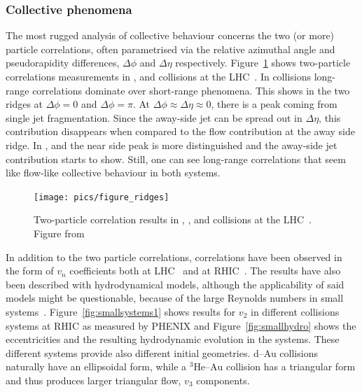 
\subsubsection{Collective phenomena}
The most rugged analysis of collective behaviour concerns the two (or more) particle correlations, often parametrised via the relative azimuthal angle and pseudorapidity differences, $\Delta \phi$ and $\Delta \eta$ respectively. Figure~\ref{fig:smallsystems2} shows two-particle correlations measurements in \PbPb, \pPb and \pp collisions at the LHC~\cite{Aad:2015gqa}. In \PbPb collisions long-range correlations dominate over short-range phenomena. This shows in the two ridges at $\Delta \phi = 0 $ and $\Delta \phi = \pi$. At $\Delta\phi\approx\Delta\eta\approx0$, there is a peak coming from single jet fragmentation. Since the away-side jet can be spread out in $\Delta\eta$, this contribution disappears when compared to the flow contribution at the away side ridge. In \pPb, and \pp the near side peak is more distinguished and the away-side jet contribution starts to show. Still, one can see long-range correlations that seem like flow-like collective behaviour in both systems. 
\begin{figure}[b!]
\centering
            	\texttt{[image: pics/figure\_ridges]}
                \caption{Two-particle correlation results in \PbPb, \pPb, and \pp collisions at the LHC~\cite{Aad:2015gqa}. Figure from~\cite{Nagle:2018nvi} }
	\label{fig:smallsystems2}
\end{figure}

In addition to the two particle correlations, correlations have been observed in the form of $v_n$ coefficients both at LHC~\cite{Acharya:2017ino} and at RHIC~\cite{Aidala:2016vgl}. The results have also been described  with hydrodynamical models, although the applicability of said models might be questionable, because of the large Reynolds numbers in small systems~\cite{Shen:2016zpp,Niemi:2014wta}. Figure~\ref{fig:smallsystems1} shows results for $v_2$ in different collisions systems at RHIC as measured by PHENIX and Figure~\ref{fig:smallhydro} shows the eccentricities and the resulting hydrodynamic evolution in the systems. These different systems provide also different initial geometries. d--Au collisions naturally have an ellipsoidal form, while a $^3\mbox{He--Au}$ collision has a triangular form and thus produces larger triangular flow, $v_3$ components. 

